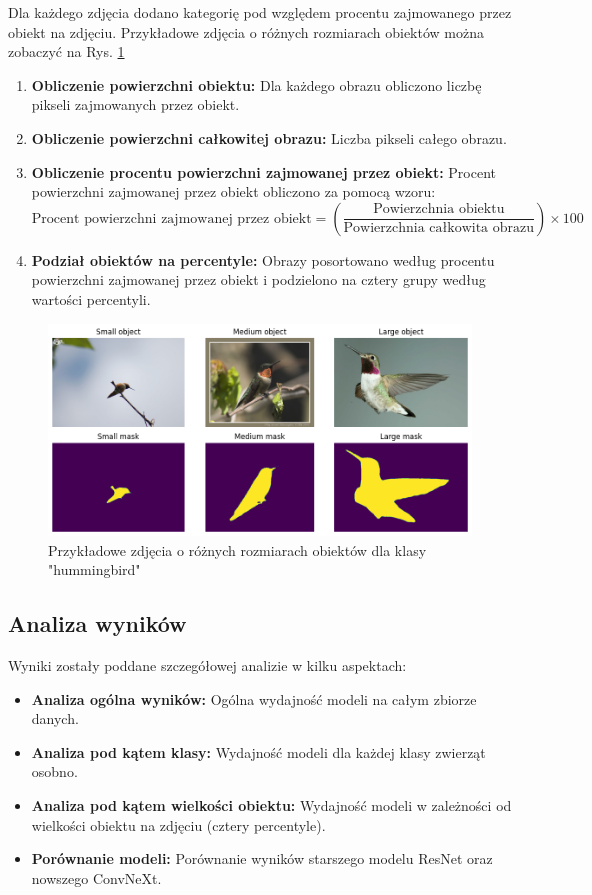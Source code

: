 Dla każdego zdjęcia dodano kategorię pod względem procentu zajmowanego przez obiekt na zdjęciu. Przykładowe zdjęcia o różnych 
rozmiarach obiektów można zobaczyć na Rys. \ref*{rys:size_comp}

\begin{enumerate}
    \item \textbf{Obliczenie powierzchni obiektu:} Dla każdego obrazu obliczono liczbę pikseli zajmowanych przez obiekt.
    \item \textbf{Obliczenie powierzchni całkowitej obrazu:} Liczba pikseli całego obrazu.
    \item \textbf{Obliczenie procentu powierzchni zajmowanej przez obiekt:} Procent powierzchni zajmowanej przez obiekt obliczono za pomocą wzoru:
    \begin{equation}
    \text{Procent powierzchni zajmowanej przez obiekt} = \left( \frac{\text{Powierzchnia obiektu}}{\text{Powierzchnia całkowita obrazu}} \right) \times 100
    \end{equation}
    \item \textbf{Podział obiektów na percentyle:} Obrazy posortowano według procentu powierzchni zajmowanej przez obiekt i 
    podzielono na cztery grupy według wartości percentyli.
\end{enumerate}

\begin{figure}
	\centering\includegraphics[width=.9\textwidth]{img/size_comp}
	\caption{Przykładowe zdjęcia o różnych rozmiarach obiektów dla klasy "hummingbird"}  \label{rys:size_comp}
\end{figure}

\subsection*{Analiza wyników}

Wyniki zostały poddane szczegółowej analizie w kilku aspektach:
\begin{itemize}
    \item \textbf{Analiza ogólna wyników:} Ogólna wydajność modeli na całym zbiorze danych.
    \item \textbf{Analiza pod kątem klasy:} Wydajność modeli dla każdej klasy zwierząt osobno.
    \item \textbf{Analiza pod kątem wielkości obiektu:} Wydajność modeli w zależności od wielkości obiektu na zdjęciu (cztery percentyle).
    \item \textbf{Porównanie modeli:} Porównanie wyników starszego modelu ResNet oraz nowszego ConvNeXt.
\end{itemize}

